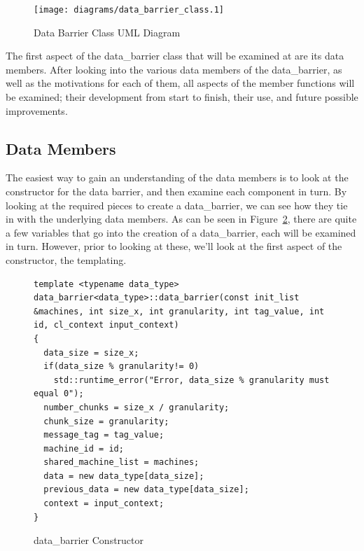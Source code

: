 \documentclass[../thesis.tex]{subfiles}
\begin{document}
\begin{figure}[htbp]
  \centering
  \texttt{[image: diagrams/data\_barrier\_class.1]}
  \caption{Data Barrier Class UML Diagram}
  \label{fig:data_barrier_class}
\end{figure}

The first aspect of the data\_barrier class that will be examined at are its data members. After looking into the various data members of the data\_barrier, as well as the motivations for each of them, all aspects of the member functions will be examined; their development from start to finish, their use, and future possible improvements.

\subsection{Data Members} %
\label{sub:data_members}
  The easiest way to gain an understanding of the data members is to look at the constructor for the data barrier, and then examine each component in turn. By looking at the required pieces to create a data\_barrier, we can see how they tie in with the underlying data members. As can be seen in Figure~\ref{fig:data_barrier_constructor}, there are quite a few variables that go into the creation of a data\_barrier, each will be examined in turn. However, prior to looking at these, we'll look at the first aspect of the constructor, the templating.

  \begin{figure}[htbp]
    \centering

    \lstset{language=cpp}  
    \begin{lstlisting}[tabsize=2]
template <typename data_type> data_barrier<data_type>::data_barrier(const init_list &machines, int size_x, int granularity, int tag_value, int id, cl_context input_context)
{
  data_size = size_x;
  if(data_size % granularity!= 0)
    std::runtime_error("Error, data_size % granularity must equal 0");
  number_chunks = size_x / granularity;
  chunk_size = granularity;
  message_tag = tag_value;
  machine_id = id;
  shared_machine_list = machines;
  data = new data_type[data_size];
  previous_data = new data_type[data_size];
  context = input_context;
}
      \end{lstlisting}

    \caption{data\_barrier Constructor}
    \label{fig:data_barrier_constructor}
  \end{figure}
   
\end{document}
